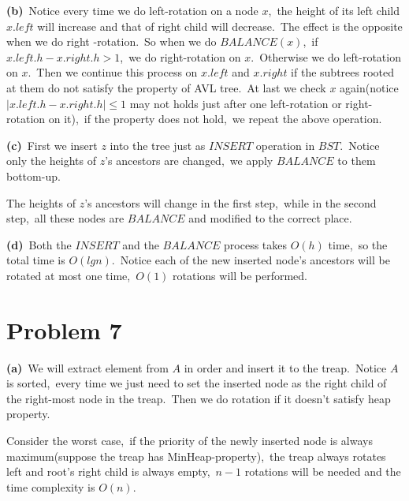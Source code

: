 \documentclass[]{article}
\begin{document}
	\textbf{(b)}\ Notice every time we do left-rotation on a node $x$,\ the height of its left child $x.left$ will increase and that of right child will decrease.\ The effect is the opposite when we do right -rotation.\ So when we do $BALANCE(x)$,\ if $x.left.h - x.right.h > 1$,\ we do right-rotation on $x$.\ Otherwise we do left-rotation on $x$.\ Then we continue this process on $x.left$ and $x.right$ if the subtrees rooted at them do not satisfy the property of AVL tree.\ At last we check $x$ again(notice $|x.left.h - x.right.h| \leq 1$ may not holds just after one left-rotation or right-rotation on it),\ if the property does not hold,\ we repeat the above operation.
	
	\textbf{(c)}\ First we insert $z$ into the tree just as $INSERT$ operation in $BST$.\ Notice only the heights of $z$'s ancestors are changed,\ we apply $BALANCE$ to them bottom-up. 
	
	The heights of $z$'s ancestors will change in the first step,\ while in the second step,\ all these nodes are $BALANCE$ and modified to the correct place.
	
	\textbf{(d)}\ Both the $INSERT$ and the $BALANCE$ process takes $O(h)$ time,\ so the total time is $O(lgn)$.\ Notice each of the new inserted node's ancestors will be rotated at most one time,\ $O(1)$ rotations will be performed.
	
	\section{Problem 7}
	\textbf{(a)}\ We will extract element from $A$ in order and insert it to the treap.\ Notice $A$ is sorted,\ every time we just need to set the inserted node as the right child of the right-most node in the treap.\ Then we do rotation if it doesn't satisfy heap property.
	
	Consider the worst case,\ if the priority of the newly inserted node is always maximum(suppose the treap has MinHeap-property),\ the treap always rotates left and root's right child is always empty,\ $n-1$ rotations will be needed and the time complexity is $O(n)$. 
	
\end{document}
